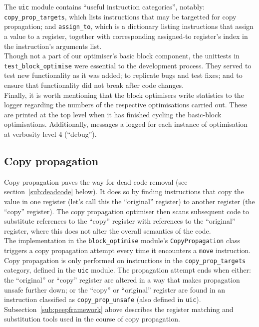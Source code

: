 The \texttt{uic} module contains ``useful instruction categories'', notably:
\texttt{copy\_prop\_targets}, which lists instructions that may be targetted for
copy propagation; and \texttt{assign\_to}, which is a dictionary listing
instructions that assign a value to a register, together with corresponding
assigned-to register's index in the instruction's arguments list.\\

Though not a part of our optimiser's basic block component, the unittests in
\texttt{test\_\-block\_\-optimise} were essential to the development process.
They served to test new functionality as it was added; to replicate bugs and
test fixes; and to ensure that functionality did not break after code changes.\\

Finally, it is worth mentioning that the block optimisers write statistics to
the logger regarding the numbers of the respective optimisations carried out.
These are printed at the top level when it has finished cycling the basic-block
optimisations. Additionally, messages a logged for each instance of optimisation
at verbosity level $4$ (``debug'').


\subsection{Copy propagation}
\label{sub:copyprop}

Copy propagation paves the way for dead code removal (see
section~\ref{sub:deadcode} below). It does so by finding instructions that copy
the value in one register (let's call this the ``original'' register) to another
register (the ``copy'' register). The copy propagation optimiser then scans
subsequent code to substitute references to the ``copy'' register with
references to the ``original'' register, where this does not alter the overall
semantics of the code.\\

The implementation in the \texttt{block\_optimise} module's
\texttt{CopyPropagation} class triggers a copy propagation attempt every time it
encounters a \texttt{move} instruction. Copy propagation is only performed on
instructions in the \texttt{copy\_prop\_targets} category, defined in the
\texttt{uic} module. The propagation attempt ends when either: the ``original''
or ``copy'' register are altered in a way that makes propagation unsafe further
down; or the ``copy'' or ``original'' register are found in an instruction
classified as \texttt{copy\_prop\_unsafe} (also defined in \texttt{uic}).
Subsection~\ref{sub:peepframework} above describes the register matching and
substitution tools used in the course of copy propagation.


